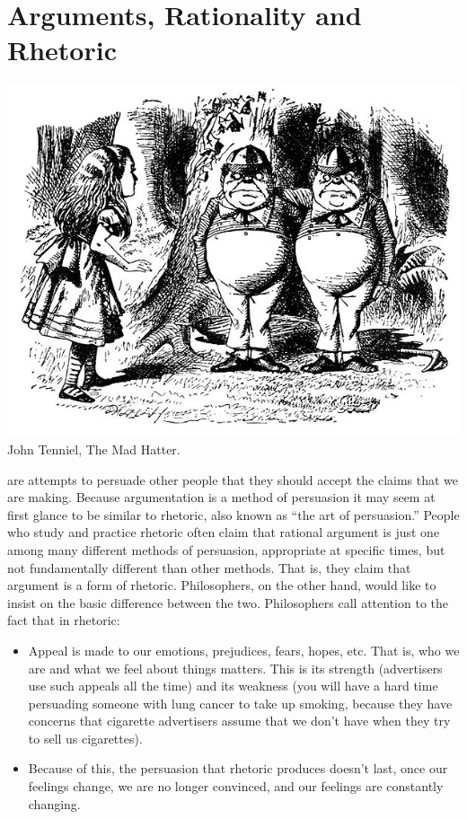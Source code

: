 \documentclass[justified]{tufte-book}
\begin{document}
\hypertarget{arguments-rationality-and-rhetoric}{%
\section{Arguments, Rationality and Rhetoric}\label{arguments-rationality-and-rhetoric}}

\begin{marginfigure}
\includegraphics{img/tenniel-tweedle-dee-dum.jpg} John Tenniel, The Mad
Hatter.
\end{marginfigure}

 are attempts to persuade other people that they should accept the claims that we are making. Because argumentation is a method of persuasion it may seem at first glance to be similar to rhetoric, also known as ``the art of persuasion.'' People who study and practice rhetoric often claim that rational argument is just one among many different methods of persuasion, appropriate at specific times, but not fundamentally different than other methods. That is, they claim that argument is a form of rhetoric. Philosophers, on the other hand, would like to insist on the basic difference between the two. Philosophers call attention to the fact that in rhetoric:

\begin{itemize}
\item
  Appeal is made to our emotions, prejudices, fears, hopes, etc. That is, who we are and what we feel about things matters. This is its strength (advertisers use such appeals all the time) and its weakness (you will have a hard time persuading someone with lung cancer to take up smoking, because they have concerns that cigarette advertisers assume that we don't have when they try to sell us cigarettes).
\item
  Because of this, the persuasion that rhetoric produces doesn't last, once our feelings change, we are no longer convinced, and our feelings are constantly changing.
\end{itemize}
\end{document}
